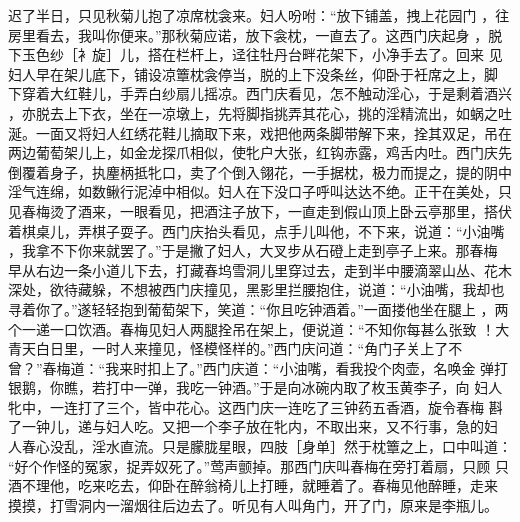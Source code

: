 迟了半日，只见秋菊儿抱了凉席枕衾来。妇人吩咐：“放下铺盖，拽上花园门
，往房里看去，我叫你便来。”那秋菊应诺，放下衾枕，一直去了。这西门庆起身
，脱下玉色纱［衤旋］儿，搭在栏杆上，迳往牡丹台畔花架下，小净手去了。回来
见妇人早在架儿底下，铺设凉簟枕衾停当，脱的上下没条丝，仰卧于衽席之上，脚
下穿着大红鞋儿，手弄白纱扇儿摇凉。西门庆看见，怎不触动淫心，于是剩着酒兴
，亦脱去上下衣，坐在一凉墩上，先将脚指挑弄其花心，挑的淫精流出，如蜗之吐
涎。一面又将妇人红绣花鞋儿摘取下来，戏把他两条脚带解下来，拴其双足，吊在
两边葡萄架儿上，如金龙探爪相似，使牝户大张，红钩赤露，鸡舌内吐。西门庆先
倒覆着身子，执麈柄抵牝口，卖了个倒入翎花，一手据枕，极力而提之，提的阴中
淫气连绵，如数鳅行泥淖中相似。妇人在下没口子呼叫达达不绝。正干在美处，只
见春梅烫了酒来，一眼看见，把酒注子放下，一直走到假山顶上卧云亭那里，搭伏
着棋桌儿，弄棋子耍子。西门庆抬头看见，点手儿叫他，不下来，说道：“小油嘴
，我拿不下你来就罢了。”于是撇了妇人，大叉步从石磴上走到亭子上来。那春梅
早从右边一条小道儿下去，打藏春坞雪洞儿里穿过去，走到半中腰滴翠山丛、花木
深处，欲待藏躲，不想被西门庆撞见，黑影里拦腰抱住，说道：“小油嘴，我却也
寻着你了。”遂轻轻抱到葡萄架下，笑道：“你且吃钟酒着。”一面搂他坐在腿上
，两个一递一口饮酒。春梅见妇人两腿拴吊在架上，便说道：“不知你每甚么张致
！大青天白日里，一时人来撞见，怪模怪样的。”西门庆问道：“角门子关上了不
曾？”春梅道：“我来时扣上了。”西门庆道：“小油嘴，看我投个肉壶，名唤金
弹打银鹅，你瞧，若打中一弹，我吃一钟酒。”于是向冰碗内取了枚玉黄李子，向
妇人牝中，一连打了三个，皆中花心。这西门庆一连吃了三钟药五香酒，旋令春梅
斟了一钟儿，递与妇人吃。又把一个李子放在牝内，不取出来，又不行事，急的妇
人春心没乱，淫水直流。只是朦胧星眼，四肢［身单］然于枕簟之上，口中叫道：
“好个作怪的冤家，捉弄奴死了。”莺声颤掉。那西门庆叫春梅在旁打着扇，只顾
只酒不理他，吃来吃去，仰卧在醉翁椅儿上打睡，就睡着了。春梅见他醉睡，走来
摸摸，打雪洞内一溜烟往后边去了。听见有人叫角门，开了门，原来是李瓶儿。

